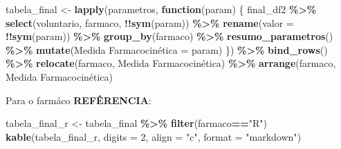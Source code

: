 \documentclass[
]{article}
\newenvironment{Shaded}{\begin{snugshade}}{\end{snugshade}}
\newcommand{\AttributeTok}[1]{\textcolor[rgb]{0.13,0.29,0.53}{#1}}
\newcommand{\ControlFlowTok}[1]{\textcolor[rgb]{0.13,0.29,0.53}{\textbf{#1}}}
\newcommand{\DecValTok}[1]{\textcolor[rgb]{0.00,0.00,0.81}{#1}}
\newcommand{\FunctionTok}[1]{\textcolor[rgb]{0.13,0.29,0.53}{\textbf{#1}}}
\newcommand{\NormalTok}[1]{#1}
\newcommand{\OtherTok}[1]{\textcolor[rgb]{0.56,0.35,0.01}{#1}}
\newcommand{\SpecialCharTok}[1]{\textcolor[rgb]{0.81,0.36,0.00}{\textbf{#1}}}
\newcommand{\StringTok}[1]{\textcolor[rgb]{0.31,0.60,0.02}{#1}}
\begin{document}
\begin{Shaded}
\begin{Highlighting}[]
\NormalTok{tabela\_final }\OtherTok{\textless{}{-}} \FunctionTok{lapply}\NormalTok{(parametros, }\ControlFlowTok{function}\NormalTok{(param) \{}
\NormalTok{  final\_df2 }\SpecialCharTok{\%\textgreater{}\%}
    \FunctionTok{select}\NormalTok{(voluntario, farmaco, }\SpecialCharTok{!!}\FunctionTok{sym}\NormalTok{(param)) }\SpecialCharTok{\%\textgreater{}\%}
    \FunctionTok{rename}\NormalTok{(}\AttributeTok{valor =} \SpecialCharTok{!!}\FunctionTok{sym}\NormalTok{(param)) }\SpecialCharTok{\%\textgreater{}\%}
    \FunctionTok{group\_by}\NormalTok{(farmaco) }\SpecialCharTok{\%\textgreater{}\%}
    \FunctionTok{resumo\_parametros}\NormalTok{() }\SpecialCharTok{\%\textgreater{}\%}
    \FunctionTok{mutate}\NormalTok{(}\StringTok{\textasciigrave{}}\AttributeTok{Medida Farmacocinética}\StringTok{\textasciigrave{}} \OtherTok{=}\NormalTok{ param)}
\NormalTok{\}) }\SpecialCharTok{\%\textgreater{}\%}
  \FunctionTok{bind\_rows}\NormalTok{() }\SpecialCharTok{\%\textgreater{}\%}
  \FunctionTok{relocate}\NormalTok{(farmaco, }\StringTok{\textasciigrave{}}\AttributeTok{Medida Farmacocinética}\StringTok{\textasciigrave{}}\NormalTok{) }\SpecialCharTok{\%\textgreater{}\%}
  \FunctionTok{arrange}\NormalTok{(farmaco, }\StringTok{\textasciigrave{}}\AttributeTok{Medida Farmacocinética}\StringTok{\textasciigrave{}}\NormalTok{)}
\end{Highlighting}
\end{Shaded}

Para o farmáco \textbf{REFÊRENCIA}:

\begin{Shaded}
\begin{Highlighting}[]
\NormalTok{tabela\_final\_r }\OtherTok{\textless{}{-}}\NormalTok{ tabela\_final }\SpecialCharTok{\%\textgreater{}\%} 
  \FunctionTok{filter}\NormalTok{(farmaco}\SpecialCharTok{==}\StringTok{"R"}\NormalTok{)}
\FunctionTok{kable}\NormalTok{(tabela\_final\_r, }\AttributeTok{digits =} \DecValTok{2}\NormalTok{, }\AttributeTok{align =} \StringTok{"c"}\NormalTok{, }\AttributeTok{format =} \StringTok{"markdown"}\NormalTok{)}
\end{Highlighting}
\end{Shaded}
\end{document}

